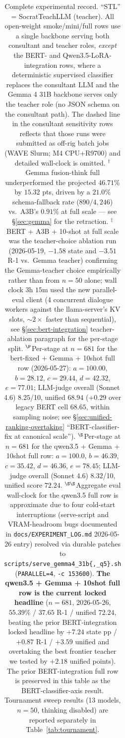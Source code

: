 \documentclass[11pt]{article}
\begin{document}
\begin{table}[t]
{\begin{tabular}{@{}llrrcccccr@{}}
    \bottomrule
  \end{tabular}%
  }
  \caption{Complete experimental record. ``STL'' = SocratTeachLLM (teacher). All open-weight smoke/mini/full rows use a single backbone serving both consultant and teacher roles, \emph{except} the BERT- and Qwen3.5-LoRA-integration rows, where a deterministic supervised classifier replaces the consultant LLM and the Gemma 4 31B backbone serves only the teacher role (no JSON schema on the consultant path). The dashed line in the consultant sensitivity rows reflects that those runs were submitted as off-rig batch jobs (WAVE Slurm; M4 CPU+R9700) and detailed wall-clock is omitted. $^{\dag}$Gemma fusion-think full underperformed the projected $46.71\%$ by $15.32$ pts, driven by a $21.0\%$ schema-fallback rate ($890/4{,}246$) vs.\ A3B's $0.91\%$ at full scale --- see \S\ref{sec:gemma} for the retraction. $^{\ddag}$BERT + A3B + 10-shot at full scale was the teacher-choice ablation run (2026-05-19, $-1.58$ state and $-3.51$ R-1 vs.\ Gemma teacher) confirming the Gemma-teacher choice empirically rather than from $n{=}50$ alone; wall clock $3$h $15$m used the new parallel-eval client (4 concurrent dialogue workers against the llama-server's KV slots, $\sim 2\times$ faster than sequential), see \S\ref{sec:bert-integration} teacher-ablation paragraph for the per-stage split. $^{\P}$Per-stage at $n{=}681$ for the bert-fixed + Gemma + 10shot full row (2026-05-27): $a{=}100.00$, $b{=}28.12$, $c{=}29.44$, $d{=}42.32$, $e{=}77.01$; LLM-judge overall (Sonnet 4.6) $8.25$/10, unified $68.94$ ($+0.29$ over legacy BERT cell $68.65$, within sampling noise; see \S\ref{sec:unified-ranking-overtaking} ``BERT-classifier-fix at canonical scale''). $^{\S}$Per-stage at $n{=}681$ for the qwen3.5 + Gemma + 10shot full row: $a{=}100.0$, $b{=}46.39$, $c{=}35.42$, $d{=}46.36$, $e{=}78.45$; LLM-judge overall (Sonnet 4.6) $8.32$/10, unified score $72.24$. $^{\S\S}$Aggregate eval wall-clock for the qwen3.5 full row is approximate due to four cold-start interruptions (serve-script and VRAM-headroom bugs documented in \texttt{docs/EXPERIMENT\_LOG.md} 2026-05-26 entry) resolved via durable patches to \texttt{scripts/serve\_gemma4\_31b\{,\_q5\}.sh} (\texttt{PARALLEL=4}, \texttt{-c 153600}). \textbf{The qwen3.5 + Gemma + 10shot full row is the current locked headline} ($n{=}681$, 2026-05-26, $55.39\%$ / $37.65$ R-1 / unified $72.24$, beating the prior BERT-integration locked headline by $+7.24$ state pp / $+0.87$ R-1 / $+3.59$ unified and overtaking the best frontier teacher we tested by $+2.18$ unified points). The prior BERT-integration full row is preserved in this table as the BERT-classifier-axis result. Tournament sweep results (13 models, $n{=}50$, thinking disabled) are reported separately in Table~\ref{tab:tournament}.}
  \label{tab:allruns}
\end{table}
\end{document}
